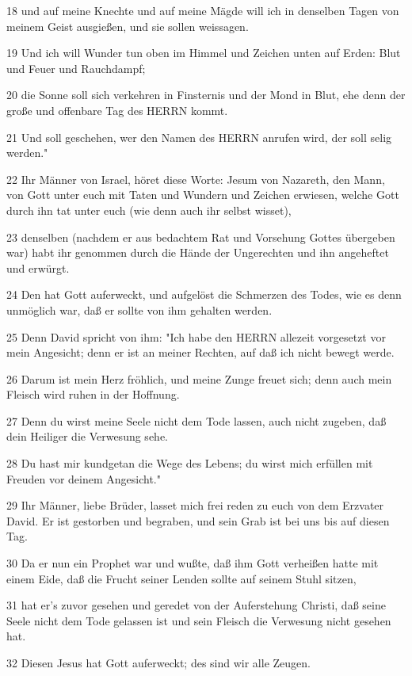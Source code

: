 \par 18 und auf meine Knechte und auf meine Mägde will ich in denselben Tagen von meinem Geist ausgießen, und sie sollen weissagen.
\par 19 Und ich will Wunder tun oben im Himmel und Zeichen unten auf Erden: Blut und Feuer und Rauchdampf;
\par 20 die Sonne soll sich verkehren in Finsternis und der Mond in Blut, ehe denn der große und offenbare Tag des HERRN kommt.
\par 21 Und soll geschehen, wer den Namen des HERRN anrufen wird, der soll selig werden."
\par 22 Ihr Männer von Israel, höret diese Worte: Jesum von Nazareth, den Mann, von Gott unter euch mit Taten und Wundern und Zeichen erwiesen, welche Gott durch ihn tat unter euch (wie denn auch ihr selbst wisset),
\par 23 denselben (nachdem er aus bedachtem Rat und Vorsehung Gottes übergeben war) habt ihr genommen durch die Hände der Ungerechten und ihn angeheftet und erwürgt.
\par 24 Den hat Gott auferweckt, und aufgelöst die Schmerzen des Todes, wie es denn unmöglich war, daß er sollte von ihm gehalten werden.
\par 25 Denn David spricht von ihm: "Ich habe den HERRN allezeit vorgesetzt vor mein Angesicht; denn er ist an meiner Rechten, auf daß ich nicht bewegt werde.
\par 26 Darum ist mein Herz fröhlich, und meine Zunge freuet sich; denn auch mein Fleisch wird ruhen in der Hoffnung.
\par 27 Denn du wirst meine Seele nicht dem Tode lassen, auch nicht zugeben, daß dein Heiliger die Verwesung sehe.
\par 28 Du hast mir kundgetan die Wege des Lebens; du wirst mich erfüllen mit Freuden vor deinem Angesicht."
\par 29 Ihr Männer, liebe Brüder, lasset mich frei reden zu euch von dem Erzvater David. Er ist gestorben und begraben, und sein Grab ist bei uns bis auf diesen Tag.
\par 30 Da er nun ein Prophet war und wußte, daß ihm Gott verheißen hatte mit einem Eide, daß die Frucht seiner Lenden sollte auf seinem Stuhl sitzen,
\par 31 hat er's zuvor gesehen und geredet von der Auferstehung Christi, daß seine Seele nicht dem Tode gelassen ist und sein Fleisch die Verwesung nicht gesehen hat.
\par 32 Diesen Jesus hat Gott auferweckt; des sind wir alle Zeugen.
